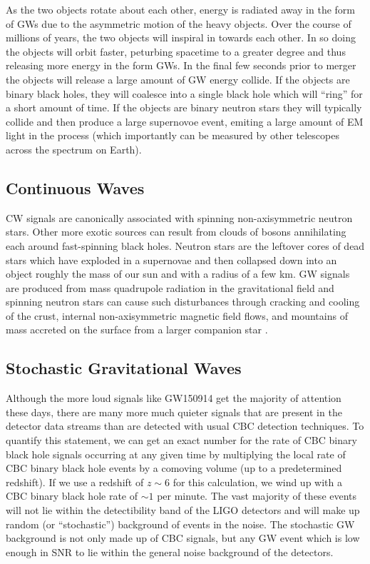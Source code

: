 As the two objects rotate about each other, energy is radiated away in the 
form of \ac{GW}s due to the asymmetric motion of the heavy objects. 
Over the course of millions of years, the two objects will 
inspiral in towards each other. In so doing the objects will 
orbit faster, peturbing spacetime to a greater degree and 
thus releasing more energy in the form \ac{GW}s. In the final few 
seconds prior to merger the objects will release a large amount of 
\ac{GW} energy collide. If the objects are binary black holes, they 
will coalesce into a single black hole which will ``ring'' for a 
short amount of time. If the objects are binary neutron stars they will 
typically collide and then produce a large supernovoe event, emiting 
a large amount of \ac{EM} light in the process (which importantly 
can be measured by other telescopes across the spectrum on Earth). 

\subsection{Continuous Waves}

\ac{CW} signals are canonically associated with spinning non-axisymmetric 
neutron stars. Other more exotic sources can result from clouds of bosons 
annihilating each around fast-spinning black holes. 
Neutron stars are the leftover cores of dead stars 
which have exploded in a supernovae and then collapsed down 
into an object roughly the mass of our sun and with a radius of a 
few km. \ac{GW} signals are produced from mass quadrupole radiation in the 
gravitational field and spinning neutron stars can cause such 
disturbances through cracking and cooling of the crust, internal non-axisymmetric 
magnetic field flows, and mountains of mass accreted on the 
surface from a larger companion star \cite{1712.05897}.

\subsection{Stochastic Gravitational Waves}
%

Although the more loud signals like GW150914 get the majority of attention these days, there are many more much quieter signals that are present in the detector data streams than are detected with usual \ac{CBC} detection techniques. To quantify this statement, we can get an exact number for the rate of \ac{CBC} binary black hole signals occurring at any given time by multiplying the local rate of \ac{CBC} binary black hole events by a comoving volume (up to a predetermined redshift). If we use a redshift of $z \sim 6$ for this calculation, we wind up with a \ac{CBC} binary black hole rate of $\sim 1$ per minute. The vast majority of these events will not lie within the detectibility band of the \ac{LIGO} detectors and will make up random (or ``stochastic'') background of events in the noise. The stochastic \ac{GW} background is not only made up of \ac{CBC} signals, but any \ac{GW} event which is low enough in \ac{SNR} to lie within the general noise background of the detectors.

